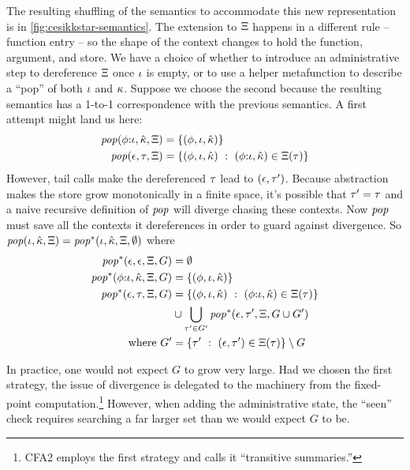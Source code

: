 The resulting shuffling of the semantics to accommodate this new representation is in \autoref{fig:cesikkstar-semantics}.
%
The extension to $\Xi$ happens in a different rule -- function entry -- so the shape of the context changes to hold the function, argument, and store.
%
We have a choice of whether to introduce an administrative step to dereference $\Xi$ once $\iota$ is empty, or to use a helper metafunction to describe a ``pop'' of both $\iota$ and $\kappa$.
%
Suppose we choose the second because the resulting semantics has a 1-to-1 correspondence with the previous semantics.
%
A first attempt might land us here:
\begin{align*}
  \mathit{pop}(\phi{\tt :} \iota,{\hat{\kappa}},\Xi) &= \{ (\phi,\iota,{\hat{\kappa}}) \} \\
  \mathit{pop}(\epsilon,\tau,\Xi) &= \{ (\phi,\iota,{\hat{\kappa}})\ :\ (\phi{\tt :} \iota, {\hat{\kappa}}) \in \Xi(\tau)\}
\end{align*}
However, tail calls make the dereferenced $\tau$ lead to $(\epsilon,\tau')$.
%
Because abstraction makes the store grow monotonically in a finite space, it's possible that $\tau' = \tau$ and a naive recursive definition of $\mathit{pop}$ will diverge chasing these contexts.
%
Now $\mathit{pop}$ must save all the contexts it dereferences in order to guard against divergence.
%
So $\mathit{pop}(\iota,{\hat{\kappa}},\Xi) = \mathit{pop}^*(\iota,{\hat{\kappa}},\Xi,\emptyset)$ where
\begin{align*}
  \mathit{pop}^*(\epsilon,\epsilon,\Xi,G) &= \emptyset \\
  \mathit{pop}^*(\phi{\tt :} \iota,{\hat{\kappa}},\Xi,G) &= \{ (\phi,\iota,{\hat{\kappa}}) \} \\
  \mathit{pop}^*(\epsilon,\tau,\Xi,G) &= \{ (\phi,\iota,{\hat{\kappa}})\ :\ (\phi{\tt :} \iota, {\hat{\kappa}}) \in \Xi(\tau)\} \\
  &\cup \bigcup\limits_{\tau' \in G'}\mathit{pop}^*(\epsilon,\tau',\Xi,G\cup G') \\
  \text{where } G' &= \{ \tau'\ :\ (\epsilon,\tau') \in \Xi(\tau)\} \setminus G
\end{align*}

In practice, one would not expect $G$ to grow very large.
%
Had we chosen the first strategy, the issue of divergence is delegated to the machinery from the fixed-point computation.\footnote{CFA2 employs the first strategy and calls it ``transitive summaries.''}
%
However, when adding the administrative state, the ``seen'' check requires searching a far larger set than we would expect $G$ to be.

